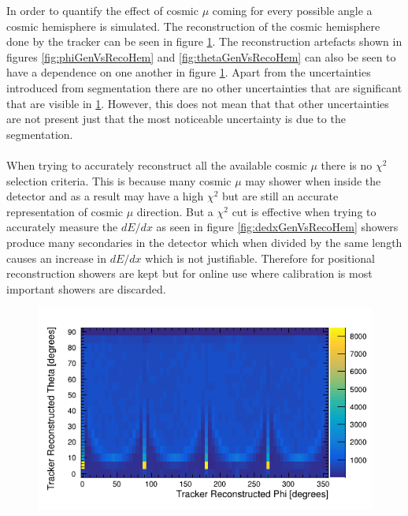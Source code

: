 In order to quantify the effect of cosmic $\mu$ coming for every possible angle a cosmic hemisphere is simulated. The reconstruction of the cosmic hemisphere done by the tracker can be seen in figure \ref{fig:simulatedHemisphereDist}. The reconstruction artefacts shown in figures \ref{fig:phiGenVsRecoHem} and \ref{fig:thetaGenVsRecoHem} can also be seen to have a dependence on one another in figure \ref{fig:simulatedHemisphereDist}. Apart from the uncertainties introduced from segmentation there are no other uncertainties that are significant that are visible in \ref{fig:simulatedHemisphereDist}. However, this does not mean that that other uncertainties are not present just that the most noticeable uncertainty is due to the segmentation. 
\\\\ When trying to accurately reconstruct all the available cosmic $\mu$ there is no $\chi^2$ selection criteria. This is because many cosmic $\mu$ may shower when inside the detector and as a result may have a high $\chi^2$ but are still an accurate representation of cosmic $\mu$ direction. But a $\chi^2$ cut is effective when trying to accurately measure the $dE/dx$ as seen in figure \ref{fig:dedxGenVsRecoHem} showers produce many secondaries in the detector which when divided by the same length causes an increase in $dE/dx$ which is not justifiable. Therefore for positional reconstruction showers are kept but for online use where calibration is most important showers are discarded.

\begin{figure}[H]
 \centering
 \includegraphics[width=0.8\linewidth]{Chapter5/Figs/Raster/phi_vs_theta_hem_simNoDead.png}
 \label{fig:simulatedHemisphereDist}
\end{figure}

